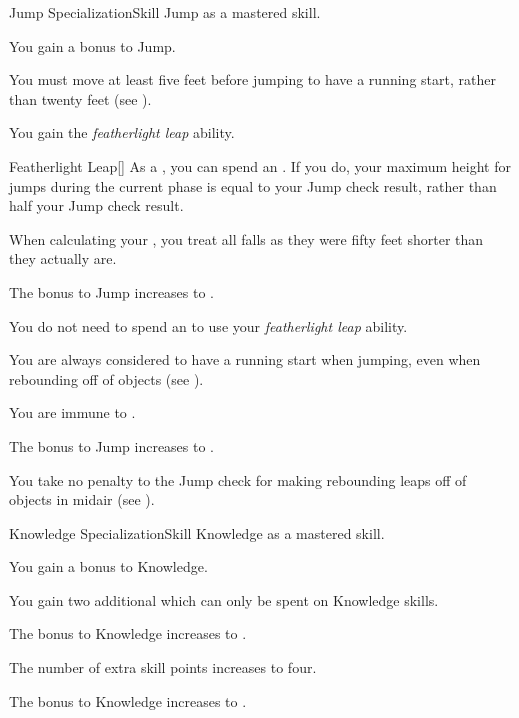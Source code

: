     \begin{feat}{Jump Specialization}{Skill}
        \featpre Jump as a mastered skill.

         You gain a  bonus to Jump.

         You must move at least five feet before jumping to have a running start, rather than twenty feet (see ).

         You gain the \textit{featherlight leap} ability.
        \begin{ability}{Featherlight Leap}[]
            As a , you can spend an .
            If you do, your maximum height for jumps during the current phase is equal to your Jump check result, rather than half your Jump check result.
        \end{ability}

         When calculating your , you treat all falls as they were fifty feet shorter than they actually are.

         The bonus to Jump increases to .

         You do not need to spend an  to use your \textit{featherlight leap} ability.

         You are always considered to have a running start when jumping, even when rebounding off of objects (see ).

         You are immune to . 

         The bonus to Jump increases to .

         You take no penalty to the Jump check for making rebounding leaps off of objects in midair (see ).
    \end{feat}

    \begin{feat}{Knowledge Specialization}{Skill}
        \featpre Knowledge as a mastered skill.

         You gain a  bonus to Knowledge.

         You gain two additional  which can only be spent on Knowledge skills.

         The bonus to Knowledge increases to .

         The number of extra skill points increases to four.

         The bonus to Knowledge increases to .
    \end{feat}

